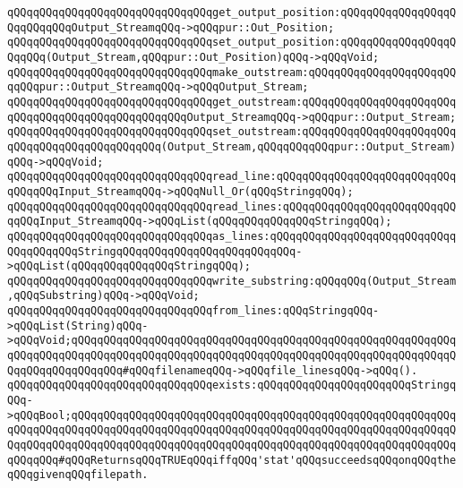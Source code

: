 \verb|qQQqqQQqqQQqqQQqqQQqqQQqqQQqqQQqget_output_position:qQQqqQQqqQQqqQQqqQQqqQQqqQQqOutput_StreamqQQq->qQQqpur::Out_Position;|\newline
\verb|qQQqqQQqqQQqqQQqqQQqqQQqqQQqqQQqset_output_position:qQQqqQQqqQQqqQQqqQQqqQQq(Output_Stream,qQQqpur::Out_Position)qQQq->qQQqVoid;|\newline
\newline
\verb|qQQqqQQqqQQqqQQqqQQqqQQqqQQqqQQqmake_outstream:qQQqqQQqqQQqqQQqqQQqqQQqqQQqpur::Output_StreamqQQq->qQQqOutput_Stream;|\newline
\verb|qQQqqQQqqQQqqQQqqQQqqQQqqQQqqQQqget_outstream:qQQqqQQqqQQqqQQqqQQqqQQqqQQqqQQqqQQqqQQqqQQqqQQqqQQqOutput_StreamqQQq->qQQqpur::Output_Stream;|\newline
\verb|qQQqqQQqqQQqqQQqqQQqqQQqqQQqqQQqset_outstream:qQQqqQQqqQQqqQQqqQQqqQQqqQQqqQQqqQQqqQQqqQQqqQQq(Output_Stream,qQQqqQQqqQQqpur::Output_Stream)qQQq->qQQqVoid;|\newline
\newline
\verb|qQQqqQQqqQQqqQQqqQQqqQQqqQQqqQQqread_line:qQQqqQQqqQQqqQQqqQQqqQQqqQQqqQQqqQQqInput_StreamqQQq->qQQqNull_Or(qQQqStringqQQq);|\newline
\verb|qQQqqQQqqQQqqQQqqQQqqQQqqQQqqQQqread_lines:qQQqqQQqqQQqqQQqqQQqqQQqqQQqqQQqInput_StreamqQQq->qQQqList(qQQqqQQqqQQqqQQqStringqQQq);|\newline
\verb|qQQqqQQqqQQqqQQqqQQqqQQqqQQqqQQqas_lines:qQQqqQQqqQQqqQQqqQQqqQQqqQQqqQQqqQQqqQQqStringqQQqqQQqqQQqqQQqqQQqqQQqqQQq->qQQqList(qQQqqQQqqQQqqQQqStringqQQq);|\newline
\verb|qQQqqQQqqQQqqQQqqQQqqQQqqQQqqQQqwrite_substring:qQQqqQQq(Output_Stream,qQQqSubstring)qQQq->qQQqVoid;|\newline
\newline
\verb|qQQqqQQqqQQqqQQqqQQqqQQqqQQqqQQqfrom_lines:qQQqStringqQQq->qQQqList(String)qQQq->qQQqVoid;qQQqqQQqqQQqqQQqqQQqqQQqqQQqqQQqqQQqqQQqqQQqqQQqqQQqqQQqqQQqqQQqqQQqqQQqqQQqqQQqqQQqqQQqqQQqqQQqqQQqqQQqqQQqqQQqqQQqqQQqqQQqqQQqqQQqqQQqqQQqqQQqqQQq#qQQqfilenameqQQq->qQQqfile_linesqQQq->qQQq().|\newline
\newline
\verb|qQQqqQQqqQQqqQQqqQQqqQQqqQQqqQQqexists:qQQqqQQqqQQqqQQqqQQqqQQqStringqQQq->qQQqBool;qQQqqQQqqQQqqQQqqQQqqQQqqQQqqQQqqQQqqQQqqQQqqQQqqQQqqQQqqQQqqQQqqQQqqQQqqQQqqQQqqQQqqQQqqQQqqQQqqQQqqQQqqQQqqQQqqQQqqQQqqQQqqQQqqQQqqQQqqQQqqQQqqQQqqQQqqQQqqQQqqQQqqQQqqQQqqQQqqQQqqQQqqQQqqQQqqQQqqQQqqQQqqQQq#qQQqReturnsqQQqTRUEqQQqiffqQQq'stat'qQQqsucceedsqQQqonqQQqtheqQQqgivenqQQqfilepath.|\newline
